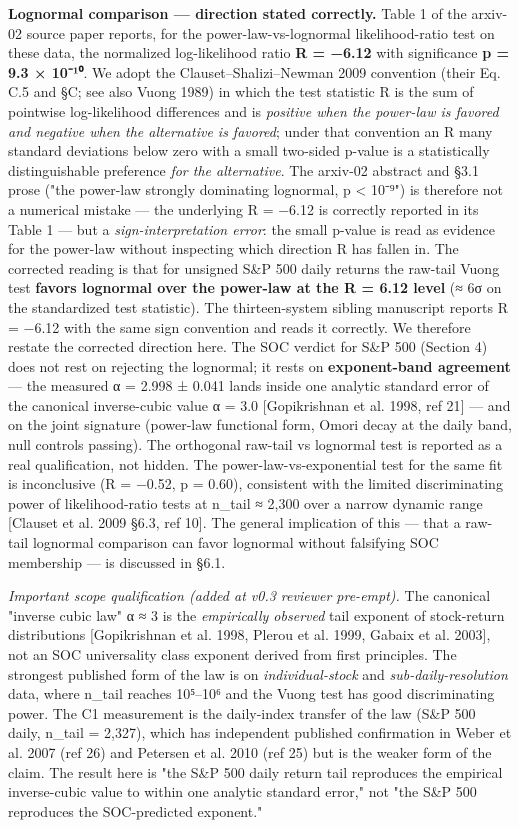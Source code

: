\documentclass[
  11pt]{article}
\begin{document}
\textbf{Lognormal comparison --- direction stated correctly.} Table 1 of
the arxiv-02 source paper reports, for the power-law-vs-lognormal
likelihood-ratio test on these data, the normalized log-likelihood ratio
\textbf{R = −6.12} with significance \textbf{p = 9.3 × 10⁻¹⁰}. We adopt
the Clauset--Shalizi--Newman 2009 convention (their Eq. C.5 and §C; see
also Vuong 1989) in which the test statistic R is the sum of pointwise
log-likelihood differences and is \emph{positive when the power-law is
favored and negative when the alternative is favored}; under that
convention an R many standard deviations below zero with a small
two-sided p-value is a statistically distinguishable preference
\emph{for the alternative}. The arxiv-02 abstract and §3.1 prose ("the
power-law strongly dominating lognormal, p \textless{} 10⁻⁹") is
therefore not a numerical mistake --- the underlying R = −6.12 is
correctly reported in its Table 1 --- but a \emph{sign-interpretation
error}: the small p-value is read as evidence for the power-law without
inspecting which direction R has fallen in. The corrected reading is
that for unsigned S\&P 500 daily returns the raw-tail Vuong test
\textbf{favors lognormal over the power-law at the \textbar R\textbar{}
= 6.12 level} (≈ 6σ on the standardized test statistic). The
thirteen-system sibling manuscript reports R = −6.12 with the same sign
convention and reads it correctly. We therefore restate the corrected
direction here. The SOC verdict for S\&P 500 (Section 4) does not rest
on rejecting the lognormal; it rests on \textbf{exponent-band agreement}
--- the measured α = 2.998 ± 0.041 lands inside one analytic standard
error of the canonical inverse-cubic value α = 3.0 {[}Gopikrishnan et
al. 1998, ref 21{]} --- and on the joint signature (power-law functional
form, Omori decay at the daily band, null controls passing). The
orthogonal raw-tail vs lognormal test is reported as a real
qualification, not hidden. The power-law-vs-exponential test for the
same fit is inconclusive (R = −0.52, p = 0.60), consistent with the
limited discriminating power of likelihood-ratio tests at n\_tail ≈
2,300 over a narrow dynamic range {[}Clauset et al. 2009 §6.3, ref
10{]}. The general implication of this --- that a raw-tail lognormal
comparison can favor lognormal without falsifying SOC membership --- is
discussed in §6.1.

\emph{Important scope qualification (added at v0.3 reviewer pre-empt).}
The canonical "inverse cubic law" α ≈ 3 is the \emph{empirically
observed} tail exponent of stock-return distributions {[}Gopikrishnan et
al. 1998, Plerou et al. 1999, Gabaix et al. 2003{]}, not an SOC
universality class exponent derived from first principles. The strongest
published form of the law is on \emph{individual-stock} and
\emph{sub-daily-resolution} data, where n\_tail reaches 10⁵--10⁶ and the
Vuong test has good discriminating power. The C1 measurement is the
daily-index transfer of the law (S\&P 500 daily, n\_tail = 2,327), which
has independent published confirmation in Weber et al. 2007 (ref 26) and
Petersen et al. 2010 (ref 25) but is the weaker form of the claim. The
result here is "the S\&P 500 daily return tail reproduces the empirical
inverse-cubic value to within one analytic standard error," not "the
S\&P 500 reproduces the SOC-predicted exponent."
\end{document}
